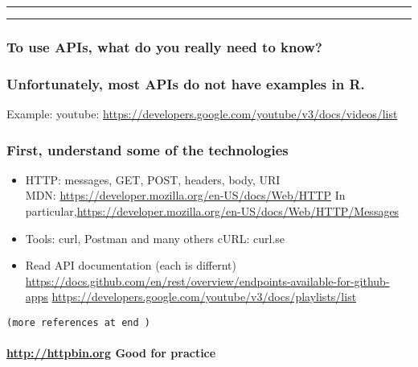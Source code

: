 \documentclass[
  10pt,
]{article}
\begin{document}
\begin{center}\rule{0.5\linewidth}{0.5pt}\end{center}

\rule{3cm}{.4pt}

\hypertarget{to-use-apis-what-do-you-really-need-to-know}{%
\subsubsection{To use APIs, what do you really need to
know?}\label{to-use-apis-what-do-you-really-need-to-know}}

\hypertarget{unfortunately-most-apis-do-not-have-examples-in-r.}{%
\subsubsection{Unfortunately, most APIs do not have examples in
R.}\label{unfortunately-most-apis-do-not-have-examples-in-r.}}

Example: youtube:
\url{https://developers.google.com/youtube/v3/docs/videos/list}

\hypertarget{first-understand-some-of-the-technologies}{%
\subsubsection{First, understand some of the
technologies}\label{first-understand-some-of-the-technologies}}

\begin{itemize}
\item
  HTTP: messages, GET, POST, headers, body, URI\\
  MDN: \url{https://developer.mozilla.org/en-US/docs/Web/HTTP} In
  particular,\url{https://developer.mozilla.org/en-US/docs/Web/HTTP/Messages}
\item
  Tools: curl, Postman and many others cURL: curl.se
\item
  Read API documentation (each is differnt)
  \url{https://docs.github.com/en/rest/overview/endpoints-available-for-github-apps}
  \url{https://developers.google.com/youtube/v3/docs/playlists/list}
\end{itemize}

\begin{verbatim}
(more references at end )
\end{verbatim}

\hypertarget{httphttpbin.org-good-for-practice}{%
\paragraph{\texorpdfstring{\url{http://httpbin.org} Good for
practice}{http://httpbin.org Good for practice}}\label{httphttpbin.org-good-for-practice}}
\end{document}
